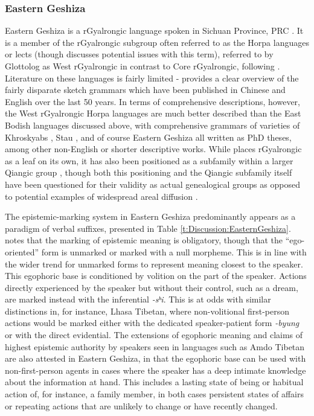 \subsubsection{Eastern Geshiza}\label{ss:Discussion:EasternGeshiza}
Eastern Geshiza is a rGyalrongic language spoken in Sichuan Province, PRC \cite{Honkasalo2019}. It is a member of the rGyalrongic subgroup often referred to as the Horpa languages or lects (though  discusses potential issues with this term), referred to by Glottolog \cite{glottolog} as West rGyalrongic in contrast to Core rGyalrongic, following \cite{Gates2012}. Literature on these languages is fairly limited -  provides a clear overview of the fairly disparate sketch grammars which have been published in Chinese and English over the last 50 years. In terms of comprehensive descriptions, however, the West rGyalrongic Horpa languages are much better described than the East Bodish languages discussed above, with comprehensive grammars of varieties of Khroskyabs \cite{Lai2017}, Stau \cites{Gates2021}{Tunzhi2019}, and of course Eastern Geshiza \cite{Honkasalo2019} all written as PhD theses, among other non-English or shorter descriptive works. While  places rGyalrongic as a leaf on its own, it has also been positioned as a subfamily within a larger Qiangic group \cite[15]{Honkasalo2019}, though both this positioning and the Qiangic subfamily itself have been questioned for their validity as actual genealogical groups as opposed to potential examples of widespread areal diffusion \cites{Honkasalo2019}{Chirkova2012}.

The epistemic-marking system in Eastern Geshiza predominantly appears as a paradigm of verbal suffixes, presented in Table \ref{t:Discussion:EasternGeshiza}.  notes that the marking of epistemic meaning is obligatory, though that the ``ego-oriented'' form is unmarked or marked with a null morpheme. This is in line with the wider trend for unmarked forms to represent meaning closest to the speaker. This egophoric base is conditioned by volition on the part of the speaker. Actions directly experienced by the speaker but without their control, such as a dream, are marked instead with the inferential \textit{-sʰi}. This is at odds with similar distinctions in, for instance, Lhasa Tibetan, where non-volitional first-person actions would be marked either with the dedicated speaker-patient form \textit{-byung} or with the direct evidential. The extensions of egophoric meaning and claims of highest epistemic authority by speakers seen in languages such as Amdo Tibetan \cite{Tribur2019} are also attested in Eastern Geshiza, in that the egophoric base can be used with non-first-person agents in cases where the speaker has a deep intimate knowledge about the information at hand. This includes a lasting state of being or habitual action of, for instance, a family member, in both cases persistent states of affairs or repeating actions that are unlikely to change or have recently changed.

